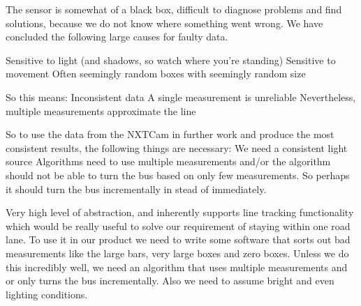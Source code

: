 The sensor is somewhat of a black box, difficult to diagnose problems and find solutions, because we do not know where something went wrong. We have concluded the following large causes for faulty data. 

Sensitive to light (and shadows, so watch where you're standing)
Sensitive to movement
Often seemingly random boxes with seemingly random size

So this means:
Inconsistent data
A single measurement is unreliable
Nevertheless, multiple measurements approximate the line 

So to use the data from the NXTCam in further work and produce the most consistent results, the following things are necessary: 
We need a consistent light source 
Algorithms need to use multiple measurements and/or the algorithm should not be able to turn the bus based on only few measurements. So perhaps it should turn the bus incrementally in stead of immediately. 



Very high level of abstraction, and inherently supports line tracking functionality which would be really useful to solve our requirement of staying within one road lane. To use it in our product we need to write some software that sorts out bad measurements like the large bars, very large boxes and zero boxes. 
Unless we do this incredibly well, we need an algorithm that uses multiple measurements and or only turns the bus incrementally. 
Also we need to assume bright and even lighting conditions.